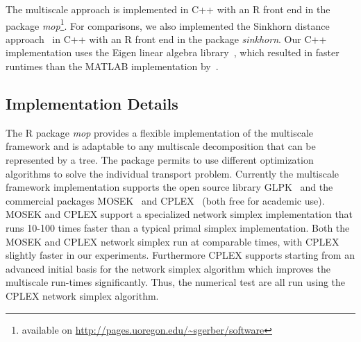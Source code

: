 \documentclass[twoside,11pt]{article}
\begin{document}
The multiscale approach is implemented in C++ with an \textsf{R} front end in
the package {\em mop}\footnote{available on
\url{http://pages.uoregon.edu/~sgerber/software}}. For comparisons, we also
implemented the Sinkhorn distance approach~\citep{cuturi:nips2013} in C++ with
an \textsf{R} front end in the package {\em
sinkhorn}\footnotemark[\value{footnote}].  Our C++ implementation uses the
Eigen linear algebra library~\citep{eigen}, which resulted in faster runtimes
than the MATLAB implementation by~\citet{cuturi:nips2013}.


\subsection{Implementation Details}
The \textsf{R} package  {\em mop} provides a flexible implementation of the
multiscale framework and is adaptable to any multiscale decomposition that can
be represented by a tree. The package permits to use different optimization
algorithms to solve the individual transport problem.  Currently the multiscale
framework implementation supports the open source library GLPK~\citep{glpk} and
the commercial packages  MOSEK~\citep{mosek} and CPLEX~\citep{cplex} (both free
for academic use). MOSEK and CPLEX support a specialized network simplex
implementation that runs 10-100 times faster than a typical primal simplex
implementation. Both the MOSEK and CPLEX network simplex run at comparable
times, with CPLEX slightly faster in our experiments.  Furthermore CPLEX
supports starting from an advanced initial basis for the network simplex
algorithm which improves the multiscale run-times significantly.  Thus, the
numerical test are all run using the CPLEX network simplex algorithm.
\end{document}
